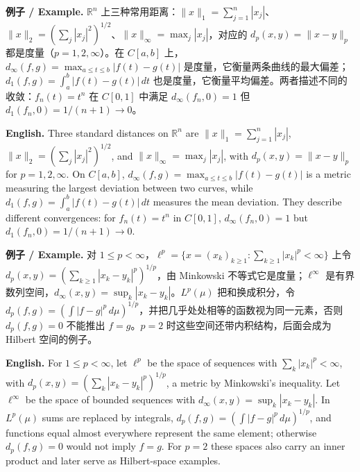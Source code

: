 \documentclass[UTF8,11pt,a4paper]{ctexart}
\newcommand{\EN}[1]{\par\noindent \textbf{English.} #1\par}
\newcommand{\EX}[2]{\par\noindent \textbf{例子 / Example.} #1\par\EN{#2}}
\begin{document}
\EX{$\mathbb R^n$ 上三种常用距离：$\|x\|_1=\sum_{j=1}^n|x_j|$、$\|x\|_2=(\sum_j|x_j|^2)^{1/2}$、$\|x\|_\infty=\max_j|x_j|$，对应的 $d_p(x,y)=\|x-y\|_p$ 都是度量（$p=1,2,\infty$）。在 $C[a,b]$ 上，$d_\infty(f,g)=\max_{a\le t\le b}|f(t)-g(t)|$ 是度量，它衡量两条曲线的最大偏差；$d_1(f,g)=\int_a^b|f(t)-g(t)|\,dt$ 也是度量，它衡量平均偏差。两者描述不同的收敛：$f_n(t)=t^n$ 在 $C[0,1]$ 中满足 $d_\infty(f_n,0)=1$ 但 $d_1(f_n,0)=1/(n+1)\to0$。}{Three standard distances on $\mathbb R^n$ are $\|x\|_1=\sum_{j=1}^n|x_j|$, $\|x\|_2=(\sum_j|x_j|^2)^{1/2}$, and $\|x\|_\infty=\max_j|x_j|$, with $d_p(x,y)=\|x-y\|_p$ for $p=1,2,\infty$. On $C[a,b]$, $d_\infty(f,g)=\max_{a\le t\le b}|f(t)-g(t)|$ is a metric measuring the largest deviation between two curves, while $d_1(f,g)=\int_a^b|f(t)-g(t)|\,dt$ measures the mean deviation. They describe different convergences: for $f_n(t)=t^n$ in $C[0,1]$, $d_\infty(f_n,0)=1$ but $d_1(f_n,0)=1/(n+1)\to0$.}

\EX{对 $1\le p<\infty$，$\ell^p=\{x=(x_k)_{k\ge1}:\sum_{k\ge1}|x_k|^p<\infty\}$ 上令 $d_p(x,y)=(\sum_{k\ge1}|x_k-y_k|^p)^{1/p}$，由 Minkowski 不等式它是度量；$\ell^\infty$ 是有界数列空间，$d_\infty(x,y)=\sup_k|x_k-y_k|$。$L^p(\mu)$ 把和换成积分，令 $d_p(f,g)=(\int|f-g|^p\,d\mu)^{1/p}$，并把几乎处处相等的函数视为同一元素，否则 $d_p(f,g)=0$ 不能推出 $f=g$。$p=2$ 时这些空间还带内积结构，后面会成为 Hilbert 空间的例子。}{For $1\le p<\infty$, let $\ell^p$ be the space of sequences with $\sum_k|x_k|^p<\infty$, with $d_p(x,y)=(\sum_k|x_k-y_k|^p)^{1/p}$, a metric by Minkowski's inequality. Let $\ell^\infty$ be the space of bounded sequences with $d_\infty(x,y)=\sup_k|x_k-y_k|$. In $L^p(\mu)$ sums are replaced by integrals, $d_p(f,g)=(\int|f-g|^p\,d\mu)^{1/p}$, and functions equal almost everywhere represent the same element; otherwise $d_p(f,g)=0$ would not imply $f=g$. For $p=2$ these spaces also carry an inner product and later serve as Hilbert-space examples.}
\end{document}
